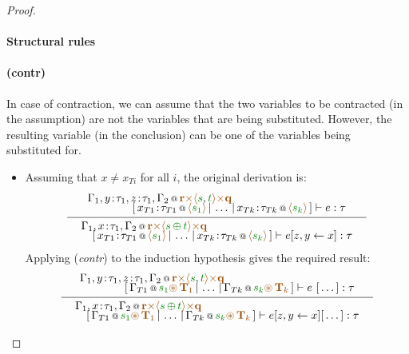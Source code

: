 \begin{proof}

\paragraph{Structural rules}

\paragraph{(contr)} In case of contraction, we can assume that the two variables to be contracted
(in the assumption) are not the variables that are being substituted. However, the resulting
variable  (in the conclusion) can be one of the variables being substituted for.

\begin{itemize}
\item Assuming that $x \neq x_{Ti}$ for all $i$, the original derivation is:
\[
\inference
  {{ \begin{array}{l}
     \coctx{\Gamma_1,y\!:\!\tau_1,z\!:\!\tau_1,\Gamma_2}{\aclrd{\textbf{r}} \atimes \alift{\cclrd{s},\cclrd{t}} \atimes \aclrd{\textbf{q}}} 
     \\[-0.35em] \hspace{4em}
     [\,\coctx{x_{T1}\!:\!\tau_{T1}}{\alift{\cclrd{s_1}}} \,|\, \ldots \,|\, \coctx{x_{Tk}\!:\!\tau_{Tk}}{\alift{\cclrd{s_k}}}\,]
    \vdash e : \tau
    \end{array} }}
  { \begin{array}{l}
    \coctx{\Gamma_1,x\!:\!\tau_1,\Gamma_2}{\aclrd{\textbf{r}} \atimes \alift{\cclrd{s} \,\cpar\, \cclrd{t}} \atimes \aclrd{\textbf{q}}} 
    \\[-0.35em] \quad
    [\,\coctx{x_{T1}\!:\!\tau_{T1}}{\alift{\cclrd{s_1}}} \,|\, \ldots \,|\, \coctx{x_{Tk}\!:\!\tau_{Tk}}{\alift{\cclrd{s_k}}}\,]
    \vdash \subst{e}{z,y}{x} : \tau
    \end{array} }
\]
Applying (\emph{contr}) to the induction hypothesis gives the required result:
\[
\inference
  {{ \begin{array}{l}
     \coctx{\Gamma_1,y\!:\!\tau_1,z\!:\!\tau_1,\Gamma_2}{\aclrd{\textbf{r}} \atimes \alift{\cclrd{s},\cclrd{t}} \atimes \aclrd{\textbf{q}}} 
     \\[-0.35em] \hspace{4em}
     [\,\coctx{\Gamma_{T1}}{\cclrd{s_1}\aseq\,\aclrd{\textbf{T}_1}} \,|\, \ldots \,|\, \coctx{\Gamma_{Tk}}{\cclrd{s_k}\aseq\,\aclrd{\textbf{T}_k}}\,]
    \vdash e~[\,\ldots\,] : \tau
    \end{array} }}
  { \begin{array}{l}
    \coctx{\Gamma_1,x\!:\!\tau_1,\Gamma_2}{\aclrd{\textbf{r}} \atimes \alift{\cclrd{s} \,\cpar\, \cclrd{t}} \atimes \aclrd{\textbf{q}}} 
    \\[-0.35em] \quad
    [\,\coctx{\Gamma_{T1}}{\cclrd{s_1}\aseq\,\aclrd{\textbf{T}_1}} \,|\, \ldots \,|\, \coctx{\Gamma_{Tk}}{\cclrd{s_k}\aseq\,\aclrd{\textbf{T}_k}}\,]
    \vdash \subst{e}{z,y}{x}[\,\ldots\,] : \tau
    \end{array} }
\]


\end{itemize}
\end{proof}
